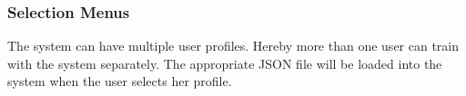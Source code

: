 \subsubsection{Selection Menus}
The system can have multiple user profiles. Hereby more than one user can train with the system separately. 
The appropriate JSON file will be loaded into the system when the user selects her profile.

